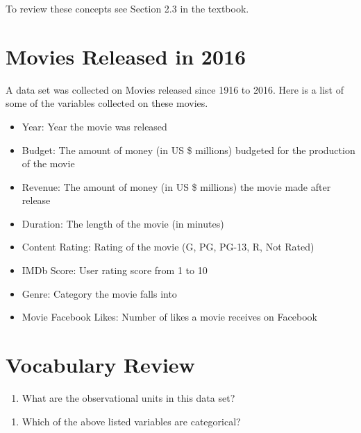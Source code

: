 \documentclass[
]{report}
\providecommand{\tightlist}{%
  \setlength{\itemsep}{0pt}\setlength{\parskip}{0pt}}
\begin{document}
To review these concepts see Section 2.3 in the textbook.

\hypertarget{movies-released-in-2016}{%
\section{Movies Released in 2016}\label{movies-released-in-2016}}

A data set was collected on Movies released since 1916 to 2016. Here is a list of some of the variables collected on these movies.

\begin{itemize}
\item
  Year: Year the movie was released
\item
  Budget: The amount of money (in US \$ millions) budgeted for the production of the movie
\item
  Revenue: The amount of money (in US \$ millions) the movie made after release
\item
  Duration: The length of the movie (in minutes)
\item
  Content Rating: Rating of the movie (G, PG, PG-13, R, Not Rated)
\item
  IMDb Score: User rating score from 1 to 10
\item
  Genre: Category the movie falls into
\item
  Movie Facebook Likes: Number of likes a movie receives on Facebook
\end{itemize}

\hypertarget{vocabulary-review-1}{%
\section{Vocabulary Review}\label{vocabulary-review-1}}

\begin{enumerate}
\def\labelenumi{\arabic{enumi}.}
\tightlist
\item
  What are the observational units in this data set?
\end{enumerate}

\vspace{0.5in}

\begin{enumerate}
\def\labelenumi{\arabic{enumi}.}
\setcounter{enumi}{1}
\tightlist
\item
  Which of the above listed variables are categorical?
\end{enumerate}

\vspace{1in}
\end{document}
